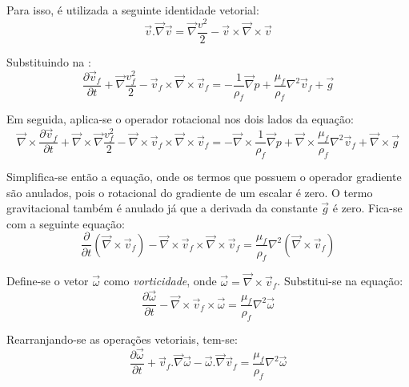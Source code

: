 Para isso, é utilizada a seguinte identidade vetorial:
\begin{equation}
    \vec{v}.\vec{\nabla}\vec{v} = \vec{\nabla} \dfrac{v^2}{2} - \vec{v}\times\vec{\nabla}\times\vec{v}
    \label{ident_vetor} 
\end{equation}

Substituindo na :
\begin{equation}
	\dfrac{\partial \vec{v}_f}{\partial t} + 
	\vec{\nabla} \dfrac{v^2_f}{2} -
	\vec{v}_f\times\vec{\nabla}\times\vec{v}_f =
    -\dfrac{1}{\rho_f} \vec{\nabla}p +
    \dfrac{\mu_f}{\rho_f} \nabla^2\vec{v}_f +
    \vec{g}
\end{equation}

Em seguida, aplica-se o operador rotacional nos dois lados da equação:
\begin{equation}
	\vec{\nabla}\times\dfrac{\partial \vec{v}_f}{\partial t} + 
	\vec{\nabla}\times\vec{\nabla} \dfrac{v^2_f}{2} -
	\vec{\nabla}\times\vec{v}_f\times\vec{\nabla}\times\vec{v}_f =
    -\vec{\nabla}\times\dfrac{1}{\rho_f} \vec{\nabla}p +
    \vec{\nabla}\times\dfrac{\mu_f}{\rho_f} \nabla^2\vec{v}_f +
    \vec{\nabla}\times\vec{g}
\end{equation}

Simplifica-se então a equação, onde os termos que possuem o operador gradiente são anulados, pois o rotacional do gradiente de um escalar é zero.
O termo gravitacional também é anulado já que a derivada da constante $\vec{g}$ é zero.
Fica-se com a seguinte equação:
\begin{equation}
	\dfrac{\partial}{\partial t}(\vec{\nabla}\times\vec{v}_f)-
	\vec{\nabla}\times\vec{v}_f\times\vec{\nabla}\times\vec{v}_f =
    \dfrac{\mu_f}{\rho_f} \nabla^2 (\vec{\nabla}\times\vec{v}_f)
\end{equation}

Define-se o vetor $\vec{\omega}$ como \textit{vorticidade}, onde $\vec{\omega}=\vec{\nabla}\times\vec{v}_f$.
Substitui-se na equação:
\begin{equation}
	\dfrac{\partial \vec{\omega}}{\partial t} -
	\vec{\nabla}\times\vec{v}_f\times\vec{\omega} =
    \dfrac{\mu_f}{\rho_f} \nabla^2 \vec{\omega}
\end{equation}

Rearranjando-se as operações vetoriais, tem-se:
\begin{equation}
	\dfrac{\partial \vec{\omega}}{\partial t} +
	\vec{v}_f.\vec{\nabla}\vec{\omega} -
	\vec{\omega}.\vec{\nabla}\vec{v}_f =
    \dfrac{\mu_f}{\rho_f} \nabla^2 \vec{\omega}
\end{equation}

